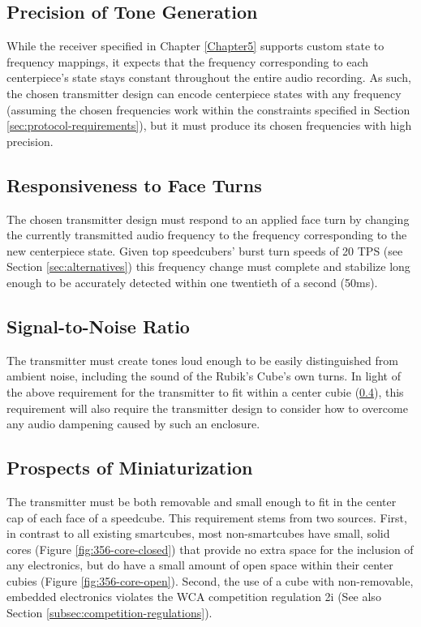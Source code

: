 \subsection{Precision of Tone Generation}
\label{subsec:precision-of-tone-generation}

While the receiver specified in Chapter \ref{Chapter5} supports custom
state to frequency mappings, it expects that the frequency
corresponding to each centerpiece's state stays constant throughout the
entire audio recording. As such, the chosen transmitter design can
encode centerpiece states with any frequency (assuming the chosen
frequencies work within the constraints specified in Section
\ref{sec:protocol-requirements}), but it must produce its chosen
frequencies with high precision.

\subsection{Responsiveness to Face Turns}
\label{subsec:responsiveness-to-face-turns}

The chosen transmitter design must respond to an applied face turn by
changing the currently transmitted audio frequency to the frequency
corresponding to the new centerpiece state. Given top speedcubers'
burst turn speeds of 20 TPS (see Section \ref{sec:alternatives}) this
frequency change must complete and stabilize long enough to be
accurately detected within one twentieth of a second (50ms).

\subsection{Signal-to-Noise Ratio}
\label{subsec:transmitter-signal-to-noise-ratio}

The transmitter must create tones loud enough to be easily
distinguished from ambient noise, including the sound of the Rubik's
Cube's own turns. In light of the above requirement for the transmitter
to fit within a center cubie
(\ref{subsec:prospects-of-miniaturization}), this requirement will also
require the transmitter design to consider how to overcome any audio
dampening caused by such an enclosure.

\subsection{Prospects of Miniaturization}
\label{subsec:prospects-of-miniaturization}

The transmitter must be both removable and small enough to fit in the
center cap of each face of a speedcube. This requirement stems from two
sources. First, in contrast to all existing smartcubes, most
non-smartcubes have small, solid cores (Figure
\ref{fig:356-core-closed}) that provide no extra space for the
inclusion of any electronics, but do have a small amount of open space
within their center cubies (Figure \ref{fig:356-core-open}). Second,
the use of a cube with non-removable, embedded electronics violates the
WCA competition regulation 2i \cite{wca-regulations} (See also Section
\ref{subsec:competition-regulations}).

